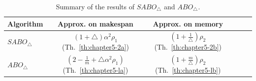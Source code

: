   \begin{table}[ht]
      \centering
      \begin{tabular}{|l|c|c|c|c|c|}
        \hline
        Algorithm & Approx. on makespan & Approx. on memory  \\
        \hline
        $SABO_\triangle$&
        $(1+\triangle)\alpha^2 \rho_1$ (Th.~\ref{th:chapter5-2a})& $(1+\frac{1}{\triangle})\rho_2$ (Th.~\ref{th:chapter5-2b})   \\
        \hline
                $ABO_\triangle$&
                $(2-\frac{1}{m}+\triangle\alpha^2 \rho_1)$ (Th.~\ref{th:chapter5-la})& $(1+\frac{m}{\triangle})\rho_2$ (Th.~\ref{th:chapter5-lb})   \\
        
        
        
        
        \hline
      \end{tabular}
      \caption{Summary of the results of $SABO_\triangle$ and $ABO_\triangle$.}
      \label{tab:template2}
    \end{table}
  

